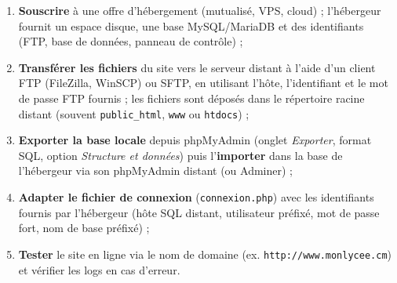 \documentclass[11pt]{article}
\newcommand{\cle}[1]{{\popxbold\color{popdark}#1}}
\begin{document}
\begin{enumerate}
  \item \textbf{Souscrire} à une offre d'hébergement (mutualisé, VPS, cloud) ; l'hébergeur fournit un espace disque, une base MySQL/MariaDB et des identifiants (FTP, base de données, panneau de contrôle) ;
  \item \textbf{Transférer les fichiers} du site vers le serveur distant à l'aide d'un client \cle{FTP} (FileZilla, WinSCP) ou \cle{SFTP}, en utilisant l'hôte, l'identifiant et le mot de passe FTP fournis ; les fichiers sont déposés dans le répertoire racine distant (souvent \texttt{public\_html}, \texttt{www} ou \texttt{htdocs}) ;
  \item \textbf{Exporter la base locale} depuis phpMyAdmin (onglet \emph{Exporter}, format SQL, option \emph{Structure et données}) puis l'\textbf{importer} dans la base de l'hébergeur via son phpMyAdmin distant (ou Adminer) ;
  \item \textbf{Adapter le fichier de connexion} (\texttt{connexion.php}) avec les identifiants fournis par l'hébergeur (hôte SQL distant, utilisateur préfixé, mot de passe fort, nom de base préfixé) ;
  \item \textbf{Tester} le site en ligne via le nom de domaine (ex. \texttt{http://www.monlycee.cm}) et vérifier les logs en cas d'erreur.
\end{enumerate}
\end{document}
